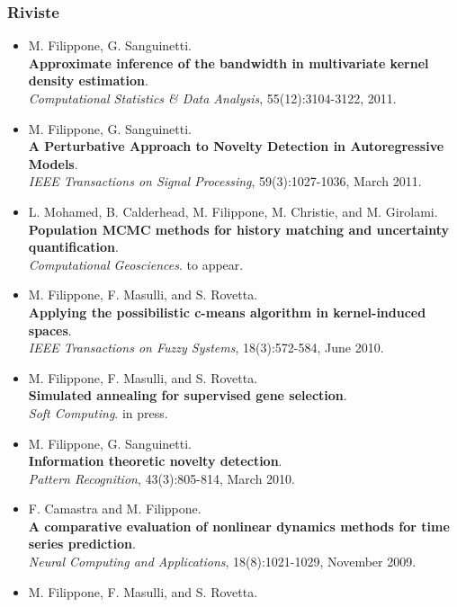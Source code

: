 \documentclass[a4paper,10pt]{article}
\begin{document}
\subsubsection*{Riviste}
\begin{itemize}
     \item  M. Filippone, G. Sanguinetti.
       \\\textbf{Approximate inference of the bandwidth in multivariate kernel density estimation}.
       \\\emph{Computational Statistics \& Data Analysis}, 55(12):3104-3122, 2011.
     \item  M. Filippone, G. Sanguinetti.
       \\\textbf{A Perturbative Approach to Novelty Detection in Autoregressive Models}.
       \\\emph{IEEE Transactions on Signal Processing}, 59(3):1027-1036, March 2011.
     \item L. Mohamed, B. Calderhead, M. Filippone, M. Christie, and M. Girolami.
       \\\textbf{Population MCMC methods for history matching and uncertainty quantification}.
       \\\emph{Computational Geosciences}. to appear.
     \item  M. Filippone, F. Masulli, and S. Rovetta.
       \\\textbf{Applying the possibilistic c-means algorithm in kernel-induced spaces}.
       \\\emph{IEEE Transactions on Fuzzy Systems}, 18(3):572-584, June 2010.
     \item  M. Filippone, F. Masulli, and S. Rovetta.
       \\\textbf{Simulated annealing for supervised gene selection}.
       \\\emph{Soft Computing}. in press.
     \item  M. Filippone, G. Sanguinetti.
       \\\textbf{Information theoretic novelty detection}.
       \\\emph{Pattern Recognition}, 43(3):805-814, March 2010.
     \item  F. Camastra and M. Filippone.
       \\\textbf{A comparative evaluation of nonlinear dynamics methods for time series prediction}.
       \\\emph{Neural Computing and Applications}, 18(8):1021-1029, November 2009.
     \item  M. Filippone, F. Masulli, and S. Rovetta.

\end{itemize}
\end{document}
